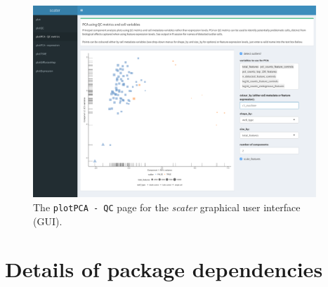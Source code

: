 \documentclass{revtex4}
\begin{document}
\begin{figure}[!tpb]
\centerline{\includegraphics[width=0.95\textwidth]{figures/scater_gui_pca_qc.pdf}}
\caption{The \texttt{plotPCA - QC} page for the \emph{scater} graphical user interface (GUI).}\label{fig:scater-pca-qc}
\end{figure}


\section*{Details of package dependencies}
\end{document}
